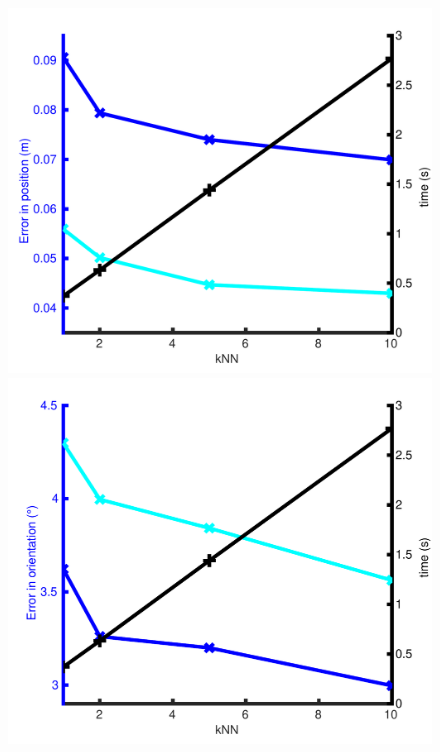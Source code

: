 \begin{figure}
    \centering
    	
   	\begin{minipage}{0.65\linewidth}		
   		\begin{minipage}{0.5\linewidth}
   			\includegraphics[width=\linewidth]{results/pos_err}
   		\end{minipage}\hfill
   		\begin{minipage}{0.5\linewidth}
   			\includegraphics[width=\linewidth]{results/ori_err}
   		\end{minipage}
   		

\end{minipage}
\end{figure}

